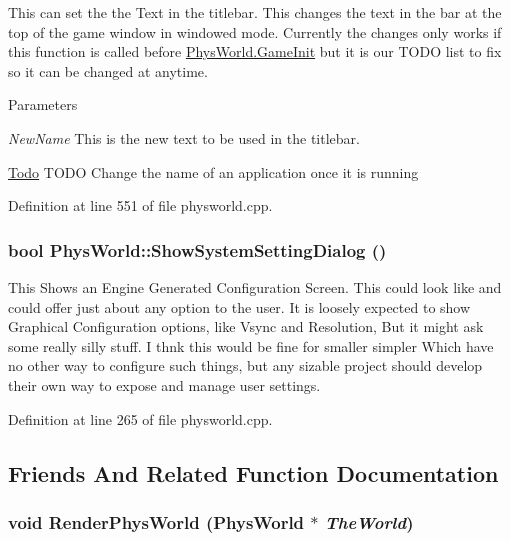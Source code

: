 This can set the the Text in the titlebar. This changes the text in the bar at the top of the game window in windowed mode. Currently the changes only works if this function is called before \hyperlink{classPhysWorld_afc5116f97cc1e91e899d1a1ca7e14e9b}{PhysWorld.GameInit} but it is our TODO list to fix so it can be changed at anytime. 
\begin{DoxyParams}{Parameters}
\item[{\em NewName}]This is the new text to be used in the titlebar. \end{DoxyParams}


\begin{Desc}
\item[\hyperlink{todo__todo000012}{Todo}]TODO Change the name of an application once it is running \end{Desc}


Definition at line 551 of file physworld.cpp.\hypertarget{classPhysWorld_a9b83f04907443c6307956a3c4089e3ca}{
\subsubsection[{ShowSystemSettingDialog}]{\setlength{\rightskip}{0pt plus 5cm}bool PhysWorld::ShowSystemSettingDialog ()}}
\label{db/df5/classPhysWorld_a9b83f04907443c6307956a3c4089e3ca}


This Shows an Engine Generated Configuration Screen. This could look like and could offer just about any option to the user. It is loosely expected to show Graphical Configuration options, like Vsync and Resolution, But it might ask some really silly stuff. I thnk this would be fine for smaller simpler Which have no other way to configure such things, but any sizable project should develop their own way to expose and manage user settings. 

Definition at line 265 of file physworld.cpp.

\subsection{Friends And Related Function Documentation}
\hypertarget{classPhysWorld_a54ca2a75bbccb9b2129f434874f1e693}{
\subsubsection[{RenderPhysWorld}]{\setlength{\rightskip}{0pt plus 5cm}void RenderPhysWorld ({\bf PhysWorld} $\ast$ {\em TheWorld})}}
\label{db/df5/classPhysWorld_a54ca2a75bbccb9b2129f434874f1e693}


